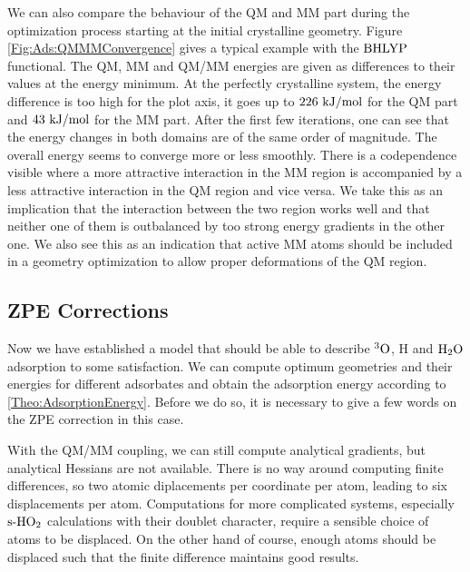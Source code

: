 We can also compare the behaviour of the QM and MM part during the optimization
process starting at the initial crystalline geometry. Figure \ref{Fig:Ads:QMMMConvergence}
gives a typical example with the $\text{BHLYP}$ functional. The QM, MM and
QM/MM energies are given as differences to their values at the energy minimum.
At the perfectly crystalline system, the energy difference is too high for the
plot axis, it goes up to $226~\text {kJ/mol}$ for the QM part and $43~\text {kJ/mol}$ for the MM part. 
After the first few iterations, one can see
that the energy changes in both domains are of the same order of magnitude. The
overall energy seems to converge more or less smoothly. There is a codependence
visible where a more attractive interaction in the MM region is accompanied by
a less attractive interaction in the QM region and vice versa. We take this as
an implication that the interaction between the two region works well and that
neither one of them is outbalanced by too strong energy gradients in the other
one. We also see this as an indication that active MM atoms should be included
in a geometry optimization to allow proper deformations of the QM region.

\subsection{ZPE Corrections}
\label{Sec:Ads:ZPE}

Now we have established a model that should be able to describe ${^3\text{O}}$, 
H and $\text H _2 \text O$ adsorption to some satisfaction. We can compute optimum geometries
and their energies for different adsorbates and obtain the adsorption energy
according to \eqref{Theo:AdsorptionEnergy}. Before we do so, it is necessary
to give a few words on the ZPE correction in this case.

With the QM/MM coupling, we can still compute analytical
gradients,%
but analytical Hessians are
not available. There is no way around computing finite differences, so
two atomic diplacements per coordinate per atom, leading to six displacements
per atom. Computations for more complicated systems, especially $\text{s-}\text H \text O_2$
calculations with their doublet character, require a sensible choice of atoms
to be displaced. On the other hand of course, enough atoms should be displaced
such that the finite difference maintains good results.

